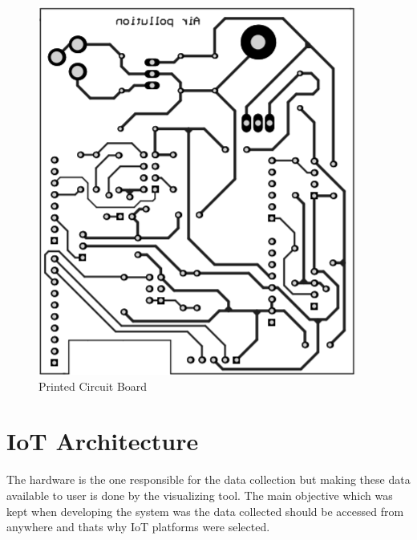 \documentclass[12pt,a4paper,oneside]{report}
\begin{document}
\begin{figure}[h]
  \begin{center}
  \includegraphics[scale=0.50]{images/figure10.png}
  \end{center}
  \caption{Printed Circuit Board}
  \label{pcb}
\end{figure}

\section*{IoT Architecture}

The hardware is the one responsible for the data collection but making these data available to user is done by the visualizing tool. The main objective which was kept when developing the system was the data collected should be accessed from anywhere and thats why IoT platforms were selected.

 
 
 
\end{document}

